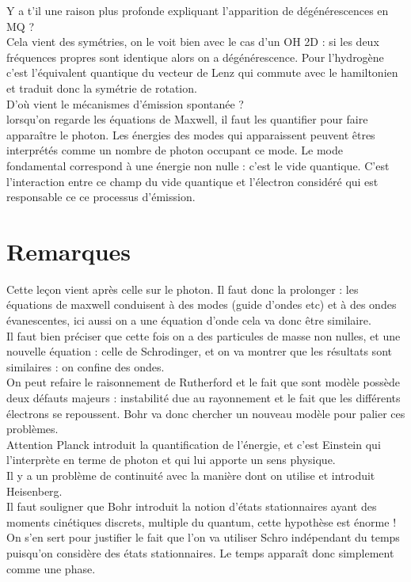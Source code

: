 \documentclass[12pt,prb,aps,epsf]{article}
\begin{document}
Y a t'il une raison plus profonde expliquant l'apparition de dégénérescences en MQ ?\\
Cela vient des symétries, on le voit bien avec le cas d'un OH 2D : si les deux fréquences propres sont identique alors on a dégénérescence. Pour l'hydrogène c'est l'équivalent quantique du vecteur de Lenz qui commute avec le hamiltonien et traduit donc la symétrie de rotation.\\

D'où vient le mécanismes d'émission spontanée ?\\
lorsqu'on regarde les équations de Maxwell, il faut les quantifier pour faire apparaître le photon. Les énergies des modes qui apparaissent peuvent êtres interprétés comme un nombre de photon occupant ce mode. Le mode fondamental correspond à une énergie non nulle : c'est le vide quantique. C'est l'interaction entre ce champ du vide quantique et l'électron considéré qui est responsable ce ce processus d'émission.

\section*{Remarques}
Cette leçon vient après celle sur le photon. Il faut donc la prolonger : les équations de maxwell conduisent à des modes (guide d'ondes etc) et à des ondes évanescentes, ici aussi on a une équation d'onde cela va donc être similaire.\\

Il faut bien préciser que cette fois on a des particules de masse non nulles, et une nouvelle équation : celle de Schrodinger, et on va montrer que les résultats sont similaires : on confine des ondes.\\

On peut refaire le raisonnement de Rutherford et le fait que sont modèle possède deux défauts majeurs : instabilité due au rayonnement et le fait que les différents électrons se repoussent. Bohr va donc chercher un nouveau modèle pour palier ces problèmes.\\

Attention Planck introduit la quantification de l'énergie, et c'est Einstein qui l'interprète en terme de photon et qui lui apporte un sens physique.\\

Il y a un problème de continuité avec la manière dont on utilise et introduit Heisenberg.\\

Il faut souligner que Bohr introduit la notion d'états stationnaires ayant des moments cinétiques discrets, multiple du quantum, cette hypothèse est énorme ! On s'en sert pour justifier le fait que l'on va utiliser Schro indépendant du temps puisqu'on considère des états stationnaires. Le temps apparaît donc simplement comme une phase.\\
\end{document}
